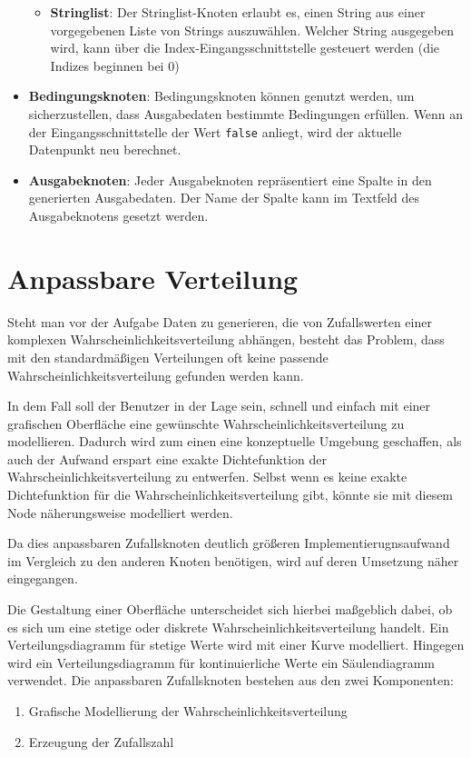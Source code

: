 \begin{itemize}
\begin{itemize}
        \item \textbf{Stringlist}: Der Stringlist-Knoten erlaubt es, einen String aus einer vorgegebenen Liste von Strings auszuwählen. Welcher String ausgegeben wird, kann über die Index-Eingangsschnittstelle gesteuert werden (die Indizes beginnen bei 0)
    \end{itemize}
    \item \textbf{Bedingungsknoten}: Bedingungsknoten können genutzt werden, um sicherzustellen, dass Ausgabedaten bestimmte Bedingungen erfüllen. Wenn an der Eingangsschnittstelle der Wert \texttt{false} anliegt, wird der aktuelle Datenpunkt neu berechnet.
    \item \textbf{Ausgabeknoten}: Jeder Ausgabeknoten repräsentiert eine Spalte in den generierten Ausgabedaten. Der Name der Spalte kann im Textfeld des Ausgabeknotens gesetzt werden.
\end{itemize}

\section{Anpassbare Verteilung}
\label{sec:anpassbareverteilung}

Steht man vor der Aufgabe Daten zu generieren, die von Zufallswerten einer komplexen Wahrscheinlichkeitsverteilung abhängen, besteht das Problem, dass mit den standardmäßigen Verteilungen oft keine passende Wahrscheinlichkeitsverteilung gefunden werden kann. 

In dem Fall soll der Benutzer in der Lage sein, schnell und einfach mit einer grafischen Oberfläche eine gewünschte Wahrscheinlichkeitsverteilung zu modellieren. Dadurch wird zum einen eine konzeptuelle Umgebung geschaffen, als auch der Aufwand erspart eine exakte Dichtefunktion der Wahrscheinlichkeitsverteilung zu entwerfen. Selbst wenn es keine exakte Dichtefunktion für die Wahrscheinlichkeitsverteilung gibt, könnte sie mit diesem Node näherungsweise modelliert werden.

Da dies anpassbaren Zufallsknoten deutlich größeren Implementierugnsaufwand im Vergleich zu den anderen Knoten benötigen, wird auf deren Umsetzung näher eingegangen.

Die Gestaltung einer Oberfläche unterscheidet sich hierbei maßgeblich dabei, ob es sich um eine stetige oder diskrete Wahrscheinlichkeitsverteilung handelt. Ein Verteilungsdiagramm für stetige Werte wird mit einer Kurve modelliert. Hingegen wird ein Verteilungsdiagramm für kontinuierliche Werte ein Säulendiagramm verwendet. Die anpassbaren Zufallsknoten bestehen aus den zwei Komponenten: 
\begin{enumerate}
    \item Grafische Modellierung der Wahrscheinlichkeitsverteilung
    \item Erzeugung der Zufallszahl
\end{enumerate}

